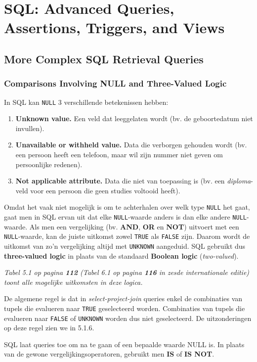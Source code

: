 \chapter{SQL: Advanced Queries, Assertions, Triggers, and Views}
\section{More Complex SQL Retrieval Queries}
\subsection{Comparisons Involving NULL and Three-Valued Logic}
In SQL kan \texttt{NULL} 3 verschillende betekenissen hebben:
\begin{enumerate}
\item \textbf{Unknown value.} Een veld dat leeggelaten wordt (bv. de geboortedatum niet invullen).
\item \textbf{Unavailable or withheld value.} Data die verborgen gehouden wordt (bv. een persoon heeft een telefoon, maar wil zijn nummer niet geven om persoonlijke redenen).
\item \textbf{Not applicable attribute.} Data die niet van toepassing is (bv. een \textit{diploma}-veld voor een persoon die geen studies voltooid heeft).
\end{enumerate}
Omdat het vaak niet mogelijk is om te achterhalen over welk type \texttt{NULL} het gaat, gaat men in SQL ervan uit dat elke \texttt{NULL}-waarde anders is dan elke andere \texttt{NULL}-waarde. Als men een vergelijking (bv. \textbf{AND}, \textbf{OR} en \textbf{NOT}) uitvoert met een \texttt{NULL}-waarde, kan de juiste uitkomst zowel \texttt{TRUE} als \texttt{FALSE} zijn. Daarom wordt de uitkomst van zo'n vergelijking altijd met \texttt{UNKNOWN} aangeduid. SQL gebruikt dus \textbf{three-valued logic} in plaats van de standaard \textbf{Boolean logic} (\textit{two-valued}).

\textit{Tabel 5.1 op pagina \textbf{112} (Tabel 6.1 op pagina \textbf{116} in zesde internationale editie) toont alle mogelijke uitkomsten in deze logica.}

De algemene regel is dat in \textit{select-project-join} queries enkel de combinaties van tupels die evalueren naar \texttt{TRUE} geselecteerd worden. Combinaties van tupels die evalueren naar \texttt{FALSE} of \texttt{UNKNOWN} worden dus niet geselecteerd. De uitzonderingen op deze regel zien we in 5.1.6.

SQL laat queries toe om na te gaan of een bepaalde waarde NULL is. In plaats van de gewone vergelijkingsoperatoren, gebruikt men \textbf{IS} of \textbf{IS NOT}.

